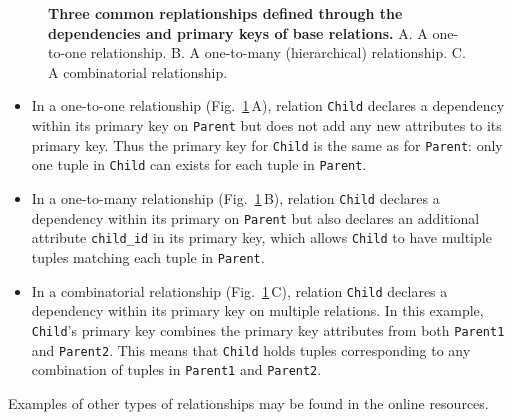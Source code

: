 \documentclass[10pt,letterpaper]{article}
\newcommand{\matlab}[1]{\texttt{#1}}
\begin{document}
\begin{figure}[h]
\begin{center}
\begin{tabular}{p{}p{}p{}}
\end{tabular}
\end{center}
\caption{
{\bf Three common replationships defined through the dependencies and primary keys of base relations.}
{\sf A.} A one-to-one relationship.
{\sf B.} A one-to-many (hierarchical) relationship.
{\sf C.} A combinatorial relationship. 
}
\label{dep}
\end{figure}


\begin{itemize}
\item
In a one-to-one relationship (Fig.\ \ref{dep}\,A), relation \matlab{Child} declares a dependency within its primary key on \matlab{Parent} but does not add any new attributes to its primary key.
Thus the primary key for \matlab{Child} is the same as for \matlab{Parent}: only one tuple in \matlab{Child} can exists for each tuple in \matlab{Parent}.
\item
In a one-to-many relationship (Fig.\ \ref{dep}\,B), relation \matlab{Child} declares a dependency within its primary on \matlab{Parent} but also declares an additional attribute \matlab{child_id} in its primary key, which allows \matlab{Child} to have multiple tuples matching each tuple in \matlab{Parent}.
\item
In a combinatorial relationship (Fig.\ \ref{dep}\,C), relation \matlab{Child} declares a dependency within its primary key on  multiple relations.
In this example, \matlab{Child}'s primary key combines the primary key attributes from both \matlab{Parent1} and \matlab{Parent2}.  
This means that \matlab{Child} holds tuples corresponding to any combination of tuples in \matlab{Parent1} and \matlab{Parent2}.
\end{itemize}
Examples of other types of relationships may be found in the online resources.
\end{document}
